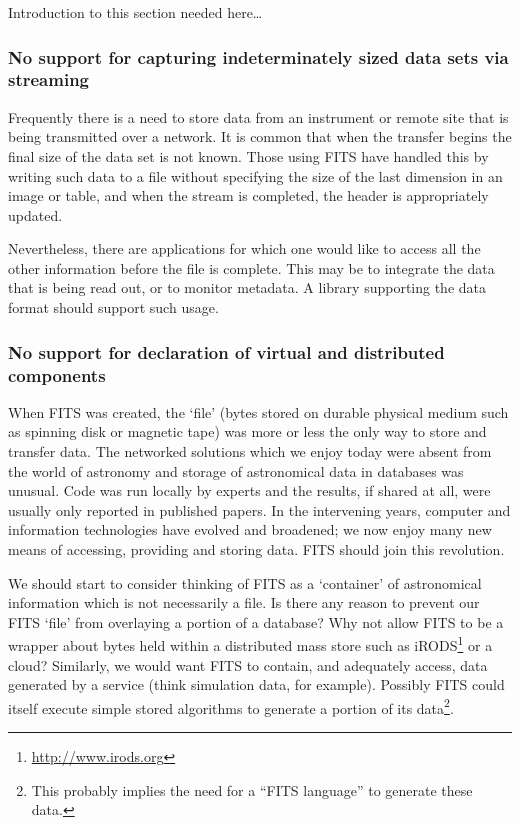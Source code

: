 \documentclass[final,authoryear,5p,times,twocolumn]{elsarticle}
\begin{document}
Introduction to this section needed here…


\subsubsection{No support for capturing indeterminately sized data sets via streaming}


Frequently there is a need to store data from an instrument or remote
site that is being transmitted over a network. It is common that when
the transfer begins the final size of the data set is not known. Those
using FITS have handled this by writing such data to a file without
specifying the size of the last dimension in an image or table, and
when the stream is completed, the header is appropriately updated.


Nevertheless, there are applications for which one would like to
access all the other information before the file is complete. This may
be to integrate the data that is being read out, or to monitor
metadata. A library supporting the data format should support such
usage.


\subsubsection{No support for declaration of virtual and distributed components}


When FITS was created, the `file' (bytes stored on durable physical
medium such as spinning disk or magnetic tape) was more or less the
only way to store and transfer data. The networked solutions which we
enjoy today were absent from the world of astronomy and storage of
astronomical data in databases was unusual. Code was run locally by
experts and the results, if shared at all, were usually only reported
in published papers. In the intervening years, computer and
information technologies have evolved and broadened; we now enjoy many
new means of accessing, providing and storing data. FITS should join
this revolution.


We should start to consider thinking of FITS as a `container' of
astronomical information which is not necessarily a file. Is there
any reason to prevent our FITS `file' from overlaying a portion of a
database? Why not allow FITS to be a wrapper about bytes held within a
distributed mass store such as
iRODS\footnote{\url{http://www.irods.org}}
or a cloud? Similarly, we would
want FITS to contain, and adequately access, data generated by a
service (think simulation data, for example). Possibly FITS could
itself execute simple stored algorithms to generate a portion of its
data\footnote{This probably implies the need for a ``FITS language'' to generate these data.}.
\end{document}

